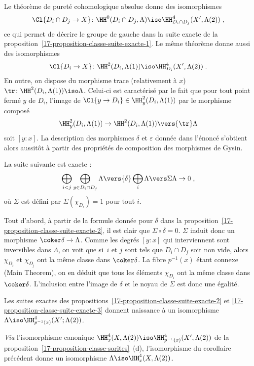 \documentclass[10pt]{../fichiers-configuration-latex/smfart}
\begin{document}
Le théorème de pureté cohomologique absolue donne des isomorphismes
\[\Cl{D_i\cap D_j\to X}\colon \HH^0(D_i\cap D_j,\Lambda)\iso \HH^4_{D_i\cap
D_j}(X',\Lambda(2))\;\text{,}\]
ce qui permet de décrire le groupe de gauche dans la suite exacte de la
proposition~\ref{17-proposition-classe-suite-exacte-1}.
Le même théorème donne aussi des isomorphismes \[\Cl{D_i\to X}\colon
\HH^2(D_i,\Lambda(1))\iso \HH^4_{D_i}(X',\Lambda(2))\;\text{.}\]
En outre, on dispose
du morphisme trace (relativement à $x$) $\tr\colon \HH^2(D_i,\Lambda(1))
\iso \Lambda$. Celui-ci est caractérisé par le fait que pour tout point fermé
$y$ de $D_i$, l'image de $\Cl{y\to D_i}\in \HH^2_y(D_i,\Lambda(1))$ par le
morphisme composé \[\HH^2_y(D_i,\Lambda(1))\to \HH^2(D_i,\Lambda(1))\vers{\tr}
\Lambda\]
soit $[y:x]$.
La description des morphismes $\delta$ et $\varepsilon$ donnée dans
l'énoncé s'obtient alors aussitôt à partir des propriétés de composition des
morphismes de Gysin.

\begin{proposition3}\label{17-proposition-classe-suite-exacte-3}
La suite suivante est exacte :
\[\bigoplus_{i<j}\bigoplus_{y\in D_i\cap D_j}\Lambda\vers {\delta}
\bigoplus_i \Lambda \vers\Sigma \Lambda\to 0\;\text{,}\]
où $\Sigma$ est défini par $\Sigma(\chi_{D_i})=1$ pour tout $i$.
\end{proposition3}

Tout d'abord, à partir de la formule donnée pour $\delta$ dans la 
proposition~\ref{17-proposition-classe-suite-exacte-2}, il est clair que
$\Sigma\circ \delta=0$. $\Sigma$ induit donc un morphisme
$\coker \delta\to \Lambda$.
Comme les degrés $[y:x]$ qui
interviennent sont inversibles dans $\Lambda$, on voit que si $i$ et $j$
sont tels que $D_i\cap D_j$ soit non vide, alors $\chi_{D_i}$ et
$\chi_{D_j}$ ont la même classe dans $\coker \delta$. La fibre $p^{-1}(x)$
étant connexe (Main Theorem), on en déduit que tous les éléments
$\chi_{D_i}$ ont la même classe dans $\coker \delta$. L'inclusion entre
l'image de $\delta$ et le noyau de $\Sigma$ est donc une égalité.

\begin{corollaire3}
Les suites exactes des propositions~\ref{17-proposition-classe-suite-exacte-2}
et \ref{17-proposition-classe-suite-exacte-3} donnent naissance à un
isomorphisme $\Lambda\iso \HH^4_{p^{-1}(x)}(X';\Lambda(2))$.
\end{corollaire3}

\begin{corollaire3}
\emph{Via} l'isomorphisme canonique $\HH^4_{x}(X,\Lambda(2))\iso
\HH^4_{p^{-1}(x)}(X',\Lambda(2))$ de la
proposition~\ref{17-proposition-classe-sorites}~(d), l'isomorphisme du
corollaire précédent donne un isomorphisme $\Lambda\iso
\HH^4_x(X,\Lambda(2))$.
\end{corollaire3}
\end{document}
